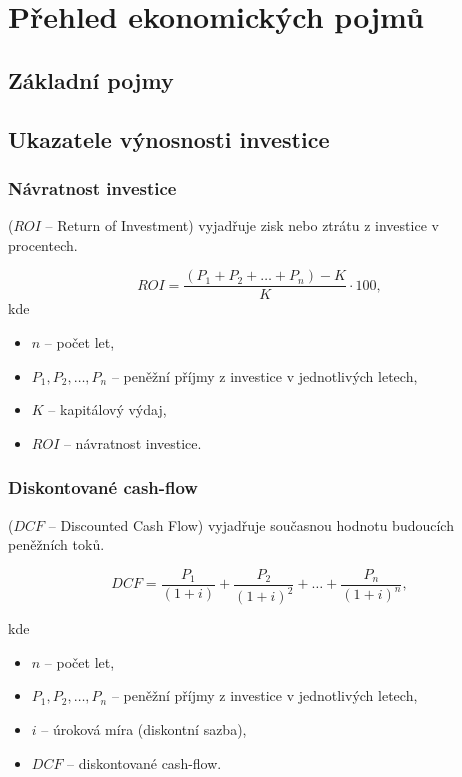 \section{Přehled ekonomických pojmů}

\subsection{Základní pojmy}

\subsection{Ukazatele výnosnosti investice}


\subsubsection{Návratnost investice}
($ROI$ -- Return of Investment)
vyjadřuje zisk nebo ztrátu z investice v procentech.

\begin{equation}
    ROI = \frac{(P_1 + P_2 + \ldots + P_n) - K}{K} \cdot 100,
\end{equation}
kde
\begin{itemize}[label={}]
    \item $n$ -- počet let,
    \item $P_1, P_2, \ldots, P_n$ -- peněžní příjmy z investice v jednotlivých letech,
    \item $K$ -- kapitálový výdaj,
    \item $ROI$ -- návratnost investice.
\end{itemize}

\subsubsection{Diskontované cash-flow}
($DCF$ -- Discounted Cash Flow)
vyjadřuje současnou hodnotu budoucích peněžních toků.

\begin{equation}
    DCF = \frac{P_1}{(1+i)} + \frac{P_2}{(1+i)^2} + \ldots + \frac{P_n}{(1+i)^n},
\end{equation}

kde

\begin{itemize}[label={}]
    \item $n$ -- počet let,
    \item $P_1, P_2, \ldots, P_n$ -- peněžní příjmy z investice v jednotlivých letech,
    \item $i$ -- úroková míra (diskontní sazba),
    \item $DCF$ -- diskontované cash-flow.
\end{itemize}


